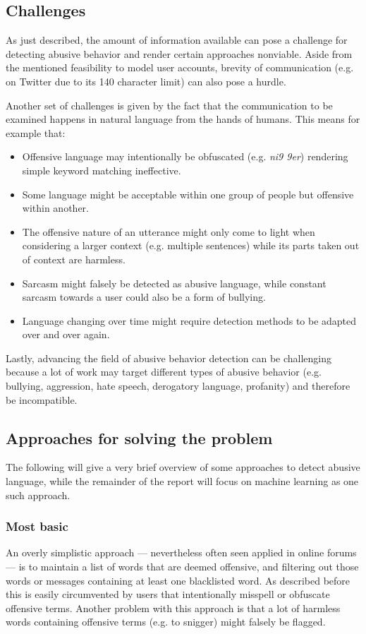 \documentclass{proseminar}
\begin{document}
\subsection{Challenges}
As just described, the amount of information available can pose a challenge for detecting abusive behavior and render certain approaches nonviable. Aside from the mentioned feasibility to model user accounts, brevity of communication (e.g. on Twitter due to its 140 character limit) can also pose a hurdle.

Another set of challenges is given by the fact that the communication to be examined happens in natural language from the hands of humans. This means for example that:
\begin{itemize}
\item Offensive language may intentionally be obfuscated (e.g. \emph{ni9 9er}) rendering simple keyword matching ineffective.
\item Some language might be acceptable within one group of people but offensive within another.
\item The offensive nature of an utterance might only come to light when considering a larger context (e.g. multiple sentences) while its parts taken out of context are harmless.
\item Sarcasm might falsely be detected as abusive language, while constant sarcasm towards a user could also be a form of bullying.
\item Language changing over time might require detection methods to be adapted over and over again.
\end{itemize}

Lastly, advancing the field of abusive behavior detection can be challenging because a lot of work may target different types of abusive behavior (e.g. bullying, aggression, hate speech, derogatory language, profanity) and therefore be incompatible.


\subsection{Approaches for solving the problem}
The following will give a very brief overview of some approaches to detect abusive language, while the remainder of the report will focus on machine learning as one such approach.

\subsubsection{Most basic} An overly simplistic approach --- nevertheless often seen applied in online forums --- is to maintain a list of words that are deemed offensive, and filtering out those words or messages containing at least one blacklisted word. As described before this is easily circumvented by users that intentionally misspell or obfuscate offensive terms. Another problem with this approach is that a lot of harmless words containing offensive terms (e.g. to snigger) might falsely be flagged.
\end{document}
